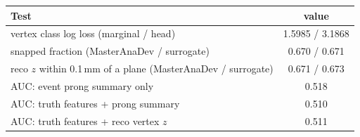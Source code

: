 \begin{tabular}{lc}
\toprule
Test & value \\
\midrule
vertex class log loss (marginal / head) & 1.5985 / 3.1868 \\
snapped fraction (MasterAnaDev / surrogate) & 0.670 / 0.671 \\
reco $z$ within 0.1\,mm of a plane (MasterAnaDev / surrogate) & 0.671 / 0.673 \\
\midrule
AUC: event prong summary only & 0.518 \\
AUC: truth features + prong summary & 0.510 \\
AUC: truth features + reco vertex $z$ & 0.511 \\
\bottomrule
\end{tabular}
